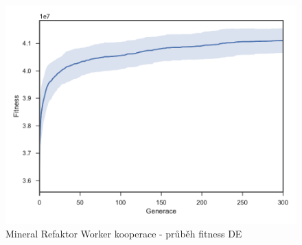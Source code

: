 \newpage
\begin{figure}[h]\centering
	\includegraphics[width=\columnwidth]{../img/MineralMap/MineralFullCoop}
	\caption{Mineral Refaktor Worker kooperace -  průběh fitness DE}
	\label{obr04:MineralFullCoop}
\end{figure}

